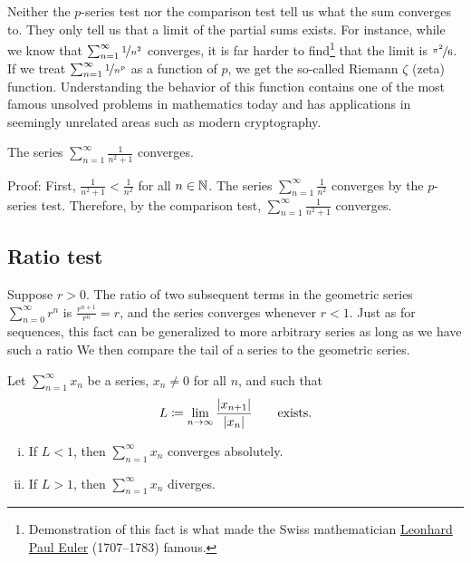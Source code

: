Neither the $p$-series test nor the comparison test 
tell us what the sum converges to.  They only tell us that a limit
of the partial sums exists.  For instance, while we know that
$\sum_{n=1}^\infty \nicefrac{1}{n^2}$ converges, it is far harder to
find\footnote{Demonstration of this fact is
what made the Swiss mathematician
\href{https://en.wikipedia.org/wiki/Leonhard_Euler}{Leonhard Paul Euler}
(1707--1783)
famous.}
that the limit is $\nicefrac{\pi^2}{6}$.
If we treat $\sum_{n=1}^\infty \nicefrac{1}{n^p}$ as a function of $p$,
we get the so-called Riemann $\zeta$ (zeta) function.  Understanding the
behavior of this function contains
one of the most famous unsolved problems in mathematics today and has applications
in seemingly unrelated areas such as modern cryptography.

\begin{example}
The series $\sum_{n=1}^\infty \frac{1}{n^2+1}$ converges.

Proof:  First, $\frac{1}{n^2+1} < \frac{1}{n^2}$ for all $n \in {\mathbb{N}}$.
The series $\sum_{n=1}^\infty \frac{1}{n^2}$ converges by the $p$-series test.
Therefore, by the comparison test, $\sum_{n=1}^\infty \frac{1}{n^2+1}$ converges.
\end{example}

\subsection{Ratio test}

Suppose $r > 0$.  The ratio of two subsequent terms in the geometric series
$\sum_{n=0}^\infty r^n$ is $\frac{r^{n+1}}{r^n} = r$, and the series converges
whenever $r < 1$.  Just as for sequences, this fact
can be generalized to more arbitrary series
as long as we have such a ratio   We then compare
the tail of a series to the geometric series.


\begin{prop}
Let $\sum_{n=1}^\infty x_n$ be a series, $x_n \not= 0$ for all $n$, and such that
\begin{equation*}
L \coloneqq \lim_{n\to\infty} \frac{\left\lvert {x_{n+1}} \right\rvert}{\left\lvert {x_n} \right\rvert}
\qquad \text{exists.}
\end{equation*}
\begin{enumerate}[(i)]
\item
If $L < 1$, then $\sum_{n=1}^\infty x_n$ converges absolutely.
\item
If $L > 1$, then $\sum_{n=1}^\infty x_n$ diverges.
\end{enumerate}
\end{prop}

